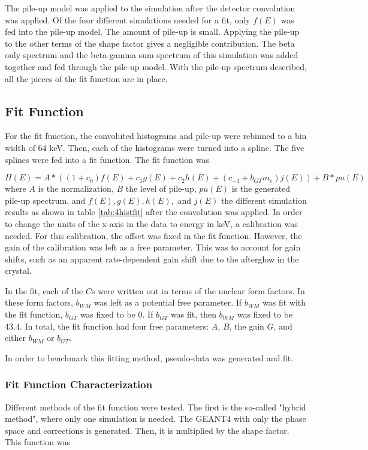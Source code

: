 \documentclass[../MaxHughesThesis.tex]{subfiles}
\begin{document}
The pile-up model was applied to the simulation after the detector convolution was applied. 
Of the four different simulations needed for a fit, only $f(E)$ was fed into the pile-up model.
The amount of pile-up is small. 
Applying the pile-up to the other terms of the shape factor gives a negligible contribution.
The beta only spectrum and the beta-gamma sum spectrum of this simulation was added together and fed through the pile-up model.
With the pile-up spectrum described, all the pieces of the fit function are in place.

\subsection{Fit Function}
For the fit function, the convoluted histograms and pile-up were rebinned to a bin width of 64 keV.
Then, each of the histograms were turned into a spline. 
The five splines were fed into a fit function.
The fit function was

\begin{equation}
	H(E) = A * (( 1 + c_{0}) f(E) + c_{1}g(E) + c_{2} h(E) + (c_{-1} + b_{GT} m_{e}) j(E)) + B * pu(E)
	\label{eq:betafit}
\end{equation}
where $A$ is the normalization, $B$ the level of pile-up, $pu(E)$ is the generated pile-up spectrum, and $f(E),g(E),h(E),$ and $j(E)$ the different simulation results as shown in table \ref{tab:4histfit} after the convolution was applied.
In order to change the units of the x-axis in the data to energy in keV, a calibration was needed.
For this calibration, the offset was fixed in the fit function.
However, the gain of the calibration was left as a free parameter.
This was to account for gain shifts, such as an apparent rate-dependent gain shift due to the afterglow in the crystal.

In the fit, each of the $C$s were written out in terms of the nuclear form factors.
In these form factors, $b_{WM}$ was left as a potential free parameter. 
If $b_{WM}$ was fit with the fit function, $b_{GT}$ was fixed to be 0. 
If $b_{GT}$ was fit, then $b_{WM}$ was fixed to be 43.4. 
In total, the fit function had four free parameters:
$A$, $B$, the gain $G$, and either $b_{WM}$ or $b_{GT}$. 

In order to benchmark this fitting method, pseudo-data was generated and fit.

\subsubsection{Fit Function Characterization}
Different methods of the fit function were tested. 
The first is the so-called "hybrid method", where only one simulation is needed.
The GEANT4 with only the phase space and corrections is generated. 
Then, it is multiplied by the shape factor.
This function was 
\end{document}
